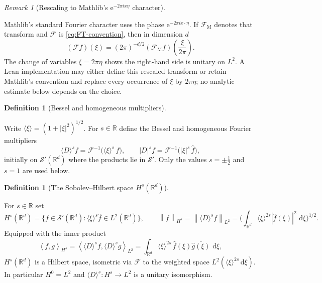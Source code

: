 \documentclass[11pt,oneside]{book}
\providecommand{\uses}[1]{}
\theoremstyle{definition}
\newtheorem{definition}[theorem]{Definition}
\theoremstyle{remark}
\newtheorem{remark}[theorem]{Remark}
\newcommand{\R}{\mathbb R}
\newcommand{\Ssch}{\mathcal S}
\newcommand{\1}{\mathbf 1}
\newcommand{\dd}{\,\mathrm d}
\newcommand{\norm}[1]{\left\lVert #1\right\rVert}
\newcommand{\abs}[1]{\left\lvert #1\right\rvert}
\newcommand{\pair}[2]{\left\langle #1,#2\right\rangle}
\newcommand{\FT}{\mathcal F}
\newcommand{\e}{\mathrm e}
\begin{document}
\begin{remark}[Rescaling to Mathlib's $\e^{-2\pi ix\eta}$ character]
\label{rem:mathlib-fourier-normalization}
\uses{def:fourier-convention}
Mathlib's standard Fourier character uses the phase $\e^{-2\pi ix\cdot\eta}$.
If $\FT_{\mathrm M}$ denotes that transform and $\FT$ is
\eqref{eq:FT-convention}, then in dimension $d$
\begin{equation}
 (\FT f)(\xi)=(2\pi)^{-d/2}(\FT_{\mathrm M}f)\!\left(\frac{\xi}{2\pi}\right).
 \label{eq:mathlib-fourier-rescaling}
\end{equation}
The change of variables $\xi=2\pi\eta$ shows the right-hand side is unitary on
$L^2$. A Lean implementation may either define this rescaled transform or retain
Mathlib's convention and replace every occurrence of $\xi$ by $2\pi\eta$; no
analytic estimate below depends on the choice.
\end{remark}

\begin{definition}[Bessel and homogeneous multipliers]\label{def:homogeneous-multiplier}
\uses{def:fourier-convention}
Write $\langle\xi\rangle=(1+\abs{\xi}^2)^{1/2}$. For $s\in\R$ define the Bessel
and homogeneous Fourier multipliers
\[
 \langle D\rangle^sf=\FT^{-1}\!\big(\langle\xi\rangle^s\,\widehat f\big),
 \qquad
 \abs{D}^sf=\FT^{-1}\!\big(\abs{\xi}^s\,\widehat f\big),
\]
initially on $\Ssch'(\R^d)$ where the products lie in $\Ssch'$. Only the values
$s=\pm\tfrac12$ and $s=1$ are used below.
\end{definition}

\begin{definition}[The Sobolev--Hilbert space $H^{s}(\R^d)$]\label{def:Hs-space}
\uses{def:fourier-convention, def:homogeneous-multiplier}
For $s\in\R$ set
\[
 H^{s}(\R^d)=\{f\in\Ssch'(\R^d):\langle\xi\rangle^s\widehat f\in L^2(\R^d)\},
 \qquad
 \norm{f}_{H^{s}}=\norm{\langle D\rangle^sf}_{L^2}
 =\Big(\int_{\R^d}\langle\xi\rangle^{2s}\abs{\widehat f(\xi)}^2\,\dd\xi\Big)^{1/2}.
\]
Equipped with the inner product
\[
 \pair{f}{g}_{H^{s}}
 =\pair{\langle D\rangle^sf}{\langle D\rangle^sg}_{L^2}
 =\int_{\R^d}\langle\xi\rangle^{2s}\,\widehat f(\xi)\overline{\widehat g(\xi)}\,\dd\xi,
\]
$H^{s}(\R^d)$ is a Hilbert space, isometric via $\FT$ to the weighted space
$L^2(\langle\xi\rangle^{2s}\dd\xi)$. In particular $H^0=L^2$ and $\langle
D\rangle^s\colon H^{s}\to L^2$ is a unitary isomorphism.
\end{definition}
\end{document}
